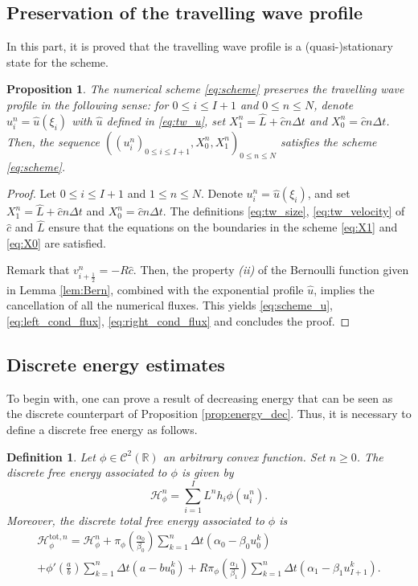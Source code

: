 \documentclass{amsart}
\newcommand\dt{\Delta t}
\renewcommand\v[2]{v_{#1 \frac{1}{2}}^{#2}}
\newcommand\R{\mathbb{R}}
\renewcommand\H{\mathcal{H}_{\phi}}
\newtheorem{proposition}[theorem]{Proposition}
\newtheorem{definition}{Definition}
\begin{document}
	\subsection{Preservation of the travelling wave profile} \label{sec:tw}
	In this part, it is proved that the travelling wave profile is a (quasi-)stationary state for the scheme.
	\begin{proposition}
		The numerical scheme \eqref{eq:scheme} preserves the travelling wave profile in the following sense: for $0 \leq i \leq I+1$ and $0 \leq n \leq N$, denote $u_i^n = \hat{u}(\xi_i)$ with $\hat{u}$ defined in \eqref{eq:tw_u}, set $X_1^n = \hat{L} + \hat{c}n\dt$ and $X_0^n = \hat{c} n \dt$.
Then, the sequence $((u_i^n)_{0 \leq i \leq I+1}, X_0^n, X_1^n)_{0 \leq n \leq N}$ satisfies the scheme \eqref{eq:scheme}.
	\end{proposition}
	\begin{proof}
		Let $0 \leq i \leq I+1$ and $1 \leq n \leq N$. Denote $u_i^n = \hat{u}(\xi_i)$, and set $X_1^n = \hat{L} + \hat{c}n\dt$ and $X_0^n = \hat{c} n \dt$.
		The definitions \eqref{eq:tw_size}, \eqref{eq:tw_velocity} of $\hat{c}$ and $\hat{L}$ ensure that the equations on the boundaries in the scheme \eqref{eq:X1} and \eqref{eq:X0} are satisfied.
		
		\noindent
		Remark that $\v{i+}{n} = -R \hat{c}$. Then, the property \textit{(ii)} of the Bernoulli function given in Lemma \ref{lem:Bern}, combined with the exponential profile ${\hat u}$, implies the cancellation of all the numerical fluxes.  This yields  \eqref{eq:scheme_u}, \eqref{eq:left_cond_flux}, \eqref{eq:right_cond_flux}  and concludes the proof.
	\end{proof}
	\subsection{Discrete energy estimates}
	To begin with, one can prove a result of decreasing energy that can be seen as the discrete counterpart of Proposition \ref{prop:energy_dec}. Thus, it is necessary to define a discrete free energy as follows.
	\begin{definition}
		Let $\phi \in \mathcal{C}^2(\R)$ an arbitrary convex function. Set $n \geq 0$. The discrete free energy associated to $\phi$ is given by
		\begin{equation*}
			\H^n = \sum_{i=1}^I L^n h_i \phi(u_i^n).
		\end{equation*}
		Moreover, the discrete total free energy associated to $\phi$  is
		\begin{multline} \label{eq:def_htot_disc}
			\H^{{\text{tot}},n} = \H^n + \pi_\phi \left( \frac{\alpha_0}{\beta_0} \right) \sum_{k=1}^n \dt (\alpha_0 - \beta_0 u_0^k) \\
			+ \phi' \left(\frac{a}{b} \right) \sum_{k=1}^n \dt (a - b u_0^k) + R\pi_\phi \left( \frac{\alpha_1}{\beta_1} \right) \sum_{k=1}^n \dt (\alpha_1 - \beta_1 u_{I+1}^k).
		\end{multline}
	\end{definition}
	
\end{document}
